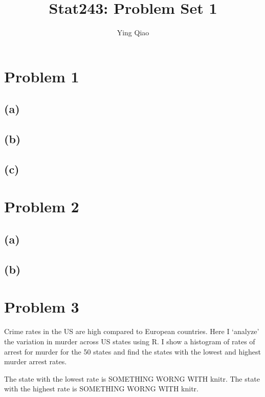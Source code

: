 \documentclass{article}
\title{Stat243: Problem Set 1}
\author{Ying Qiao}
\newcommand{\rinline}[1]{SOMETHING WORNG WITH knitr}
\begin{document}
\maketitle
\newpage

\section*{Problem 1}
\subsection*{(a)}

\subsection*{(b)}

\subsection*{(c)}

\newpage

\section*{Problem 2}
\subsection*{(a)}

\subsection*{(b)}

\newpage

\section*{Problem 3}

Crime rates in the US are high compared to European countries. Here I `analyze' the variation in murder across US states using R. I show a histogram of rates of arrest for murder for the 50 states and find the states with the lowest and highest murder arrest rates.



The state with the lowest rate is \rinline{attributes(USArrests)$row.names[which.min(USArrests$Murder)]}. The state with the highest rate is \rinline{attributes(USArrests)$row.names[which.max(USArrests$Murder)]}.
\end{document}
